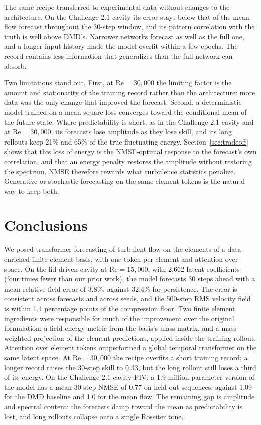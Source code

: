 \documentclass[conf]{new-aiaa}
\newcommand{\Rey}{\mathrm{Re}}
\begin{document}
The same recipe transferred to experimental data without changes to the architecture. On the Challenge 2.1 cavity its error stays below that of the mean-flow forecast throughout the 30-step window, and its pattern correlation with the truth is well above DMD's. Narrower networks forecast as well as the full one, and a longer input history made the model overfit within a few epochs. The record contains less information that generalizes than the full network can absorb.

Two limitations stand out. First, at $\Rey=30{,}000$ the limiting factor is the amount and stationarity of the training record rather than the architecture: more data was the only change that improved the forecast. Second, a deterministic model trained on a mean-square loss converges toward the conditional mean of the future state. Where predictability is short, as in the Challenge 2.1 cavity and at $\Rey=30{,}000$, its forecasts lose amplitude as they lose skill, and its long rollouts keep 21\% and 65\% of the true fluctuating energy. Section~\ref{sec:tradeoff} shows that this loss of energy is the NMSE-optimal response to the forecast's own correlation, and that an energy penalty restores the amplitude without restoring the spectrum. NMSE therefore rewards what turbulence statistics penalize. Generative or stochastic forecasting on the same element tokens \cite{kohl2023acdm,lippe2023pderefiner} is the natural way to keep both.

\section{Conclusions}
\label{sec:conclusions}
We posed transformer forecasting of turbulent flow on the elements of a data-enriched finite element basis, with one token per element and attention over space. On the lid-driven cavity at $\Rey=15{,}000$, with 2,662 latent coefficients (four times fewer than our prior work), the model forecasts 30 steps ahead with a mean relative field error of 3.8\%, against 32.4\% for persistence. The error is consistent across forecasts and across seeds, and the 500-step RMS velocity field is within 1.4 percentage points of the compression floor. Two finite element ingredients were responsible for much of the improvement over the original formulation: a field-energy metric from the basis's mass matrix, and a mass-weighted projection of the element predictions, applied inside the training rollout. Attention over element tokens outperformed a global temporal transformer on the same latent space. At $\Rey=30{,}000$ the recipe overfits a short training record; a longer record raises the 30-step skill to 0.33, but the long rollout still loses a third of its energy. On the Challenge 2.1 cavity PIV, a 1.9-million-parameter version of the model has a mean 30-step NMSE of 0.77 on held-out sequences, against 1.09 for the DMD baseline and 1.0 for the mean flow. The remaining gap is amplitude and spectral content: the forecasts damp toward the mean as predictability is lost, and long rollouts collapse onto a single Rossiter tone.
\end{document}
